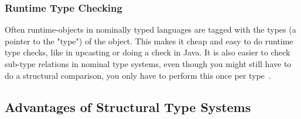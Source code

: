 %
%
%

\subsubsection{Runtime Type Checking}\label{subsubsec:runtime-type-checking}

Often runtime-objects in nominally typed languages are tagged with the types (a pointer to the "type") of the object.
This makes it cheap and easy to do runtime type checks, like in upcasting or doing a  check in Java.
It is also easier to check sub-type relations in nominal type systems, even though you might still have to do a structural comparison, you only have to perform this once per type~\cite{tapl}.

\subsection{Advantages of Structural Type Systems}\label{subsec:advantages-of-structural-types}

